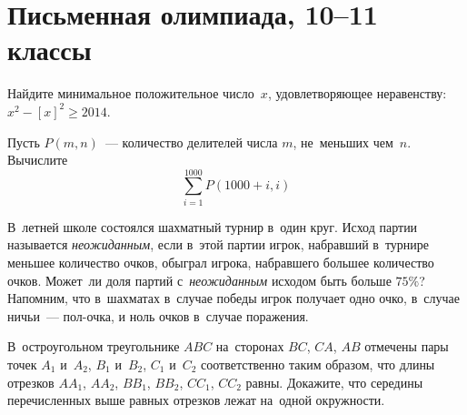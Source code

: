 

\section*{Письменная олимпиада, 10--11 классы}


\begin{problems}

\item
Найдите минимальное положительное число~$x$, удовлетворяющее неравенству:
$x^2 - [x]^2 \geq 2014$.

\item
Пусть $P(m, n)$~--- количество делителей числа $m$, не~меньших чем~$n$.
Вычислите
\[
    \sum_{i=1}^{1000}
        P(1000 + i, i)
\]

\item
В~летней школе состоялся шахматный турнир в~один круг.
Исход партии называется \emph{неожиданным}, если в~этой партии игрок, набравший
в~турнире меньшее количество очков, обыграл игрока, набравшего большее
количество очков.
Может~ли доля партий с~\emph{неожиданным} исходом быть больше $75\%$?
Напомним, что в~шахматах в~случае победы игрок получает одно очко, в~случае
ничьи~--- пол-очка, и ноль очков в~случае поражения.

\item
В~остроугольном треугольнике $ABC$ на~сторонах $BC$, $CA$, $AB$ отмечены пары
точек $A_1$ и~$A_2$, $B_1$ и~$B_2$, $C_1$ и~$C_2$ соответственно таким образом,
что длины отрезков $A A_1$, $A A_2$, $B B_1$, $B B_2$, $C C_1$, $C C_2$ равны.
Докажите, что середины перечисленных выше равных отрезков лежат на~одной
окружности.

\end{problems}

